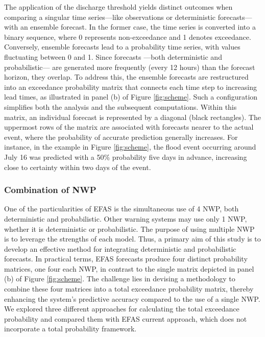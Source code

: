 \documentclass[preprint,12pt,authoryear]{elsarticle}
\begin{document}
The application of the discharge threshold yields distinct outcomes when comparing a singular time series—like observations or deterministic forecasts—with an ensemble forecast. In the former case, the time series is converted into a binary sequence, where 0 represents non-exceedance and 1 denotes exceedance. Conversely, ensemble forecasts lead to a probability time series, with values fluctuating between 0 and 1. Since forecasts —both deterministic and probabilistic— are generated more frequently (every 12 hours) than the forecast horizon, they overlap. To address this, the ensemble forecasts are restructured into an exceedance probability matrix that connects each time step to increasing lead times, as illustrated in panel (b) of Figure \ref{fig:scheme}. Such a configuration simplifies both the analysis and the subsequent computations. Within this matrix, an individual forecast is represented by a diagonal (black rectangles). The uppermost rows of the matrix are associated with forecasts nearer to the actual event, where the probability of accurate prediction generally increases. For instance, in the example in Figure \ref{fig:scheme}, the flood event occurring around July 16 was predicted with a 50\% probability five days in advance, increasing close to certainty within two days of the event.

\subsubsection{Combination of NWP}
\label{sec:methods_COMB}

One of the particularities of EFAS is the simultaneous use of 4 NWP, both deterministic and probabilistic. Other warning systems may use only 1 NWP, whether it is deterministic or probabilistic. The purpose of using multiple NWP is to leverage the strengths of each model. Thus, a primary aim of this study is to develop an effective method for integrating deterministic and probabilistic forecasts. In practical terms, EFAS forecasts produce four distinct probability matrices, one four each NWP, in contrast to the single matrix depicted in panel (b) of Figure \ref{fig:scheme}. The challenge lies in devising a methodology to combine these four matrices into a total exceedance probability matrix, thereby enhancing the system's predictive accuracy compared to the use of a single NWP. We explored three different approaches for calculating the total exceedance probability and compared them with EFAS current approach, which does not incorporate a total probability framework.
\end{document}

